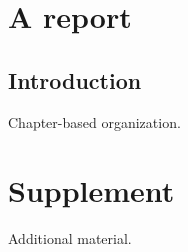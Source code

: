 \documentclass[fontsize=11pt,paper=a4,DIV=12,oneside]{scrreprt}
\begin{document}
\tableofcontents\chapter{A report}\section{Introduction}Chapter-based organization.
\appendix\chapter{Supplement}Additional material.
\end{document}
